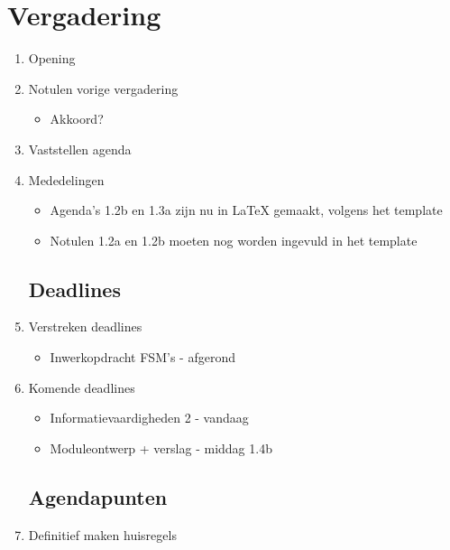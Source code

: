 \documentclass{article}
\begin{document}
\section*{Vergadering}
\begin{enumerate}
	
	\subsection*{Vooraf}
	\item Opening
	\item Notulen vorige vergadering
	\begin{itemize}
		\item Akkoord?
	\end{itemize}
	\item Vaststellen agenda
	\item Mededelingen
	\begin{itemize}
		\item Agenda's 1.2b en 1.3a zijn nu in LaTeX gemaakt, volgens het template
		\item Notulen 1.2a en 1.2b moeten nog worden ingevuld in het template
	\end{itemize}

	\subsection*{Deadlines}
	\item Verstreken deadlines
	\begin{itemize}
		\item Inwerkopdracht FSM's - afgerond
	\end{itemize}
	\item Komende deadlines
	\begin{itemize}
		\item Informatievaardigheden 2 - vandaag
		\item Moduleontwerp + verslag - middag 1.4b
	\end{itemize}

	\subsection*{Agendapunten}
	\item Definitief maken huisregels
	


\end{enumerate}
\end{document}
